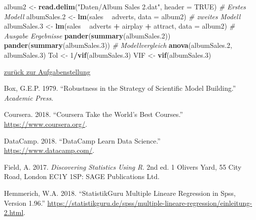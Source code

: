 \documentclass[]{article}
\newenvironment{Shaded}{\begin{snugshade}}{\end{snugshade}}
\newcommand{\KeywordTok}[1]{\textcolor[rgb]{0.13,0.29,0.53}{\textbf{#1}}}
\newcommand{\DataTypeTok}[1]{\textcolor[rgb]{0.13,0.29,0.53}{#1}}
\newcommand{\DecValTok}[1]{\textcolor[rgb]{0.00,0.00,0.81}{#1}}
\newcommand{\StringTok}[1]{\textcolor[rgb]{0.31,0.60,0.02}{#1}}
\newcommand{\CommentTok}[1]{\textcolor[rgb]{0.56,0.35,0.01}{\textit{#1}}}
\newcommand{\OtherTok}[1]{\textcolor[rgb]{0.56,0.35,0.01}{#1}}
\newcommand{\OperatorTok}[1]{\textcolor[rgb]{0.81,0.36,0.00}{\textbf{#1}}}
\newcommand{\NormalTok}[1]{#1}
\begin{document}
\begin{Shaded}
\begin{Highlighting}[]
\NormalTok{  album2       <-}\StringTok{ }\KeywordTok{read.delim}\NormalTok{(}\StringTok{"Daten/Album Sales 2.dat"}\NormalTok{, }\DataTypeTok{header =} \OtherTok{TRUE}\NormalTok{)}
  \CommentTok{# Erstes Modell}
\NormalTok{  albumSales.}\DecValTok{2}\NormalTok{ <-}\StringTok{ }\KeywordTok{lm}\NormalTok{(sales }\OperatorTok{~}\StringTok{ }\NormalTok{adverts, }\DataTypeTok{data =}\NormalTok{ album2)}
  \CommentTok{# zweites Modell}
\NormalTok{  albumSales.}\DecValTok{3}\NormalTok{ <-}\StringTok{ }\KeywordTok{lm}\NormalTok{(sales }\OperatorTok{~}\StringTok{ }\NormalTok{adverts }\OperatorTok{+}\StringTok{ }\NormalTok{airplay }\OperatorTok{+}\StringTok{ }\NormalTok{attract, }\DataTypeTok{data =}\NormalTok{ album2)}
  \CommentTok{# Ausgabe Ergebnisse}
  \KeywordTok{pander}\NormalTok{(}\KeywordTok{summary}\NormalTok{(albumSales.}\DecValTok{2}\NormalTok{))}
  \KeywordTok{pander}\NormalTok{(}\KeywordTok{summary}\NormalTok{(albumSales.}\DecValTok{3}\NormalTok{))}
  \CommentTok{# Modellvergleich}
  \KeywordTok{anova}\NormalTok{(albumSales.}\DecValTok{2}\NormalTok{, albumSales.}\DecValTok{3}\NormalTok{)}
\NormalTok{  Tol <-}\StringTok{ }\DecValTok{1}\OperatorTok{/}\KeywordTok{vif}\NormalTok{(albumSales.}\DecValTok{3}\NormalTok{)}
\NormalTok{  VIF <-}\StringTok{ }\KeywordTok{vif}\NormalTok{(albumSales.}\DecValTok{3}\NormalTok{)}
\end{Highlighting}
\end{Shaded}

\protect\hyperlink{aufgabe-mlr-1}{zurück zur Aufgabenstellung}

\hypertarget{refs}{}
\hypertarget{ref-Box}{}
Box, G.E.P. 1979. ``Robustness in the Strategy of Scientific Model
Building.'' \emph{Academic Press}.

\hypertarget{ref-CourseRa}{}
Coursera. 2018. ``Coursera Take the World's Best Courses.''
\url{https://www.coursera.org/}.

\hypertarget{ref-DataCamp}{}
DataCamp. 2018. ``DataCamp Learn Data Science.''
\url{https://www.datacamp.com/}.

\hypertarget{ref-Field}{}
Field, A. 2017. \emph{Discovering Statistics Using R}. 2nd ed. 1 Olivers
Yard, 55 City Road, London EC1Y 1SP: SAGE Publications Ltd.

\hypertarget{ref-Hemmerich}{}
Hemmerich, W.A. 2018. ``StatistikGuru Multiple Lineare Regression in
Spss, Version 1.96.''
\url{https://statistikguru.de/spss/multiple-lineare-regression/einleitung-2.html}.
\end{document}
